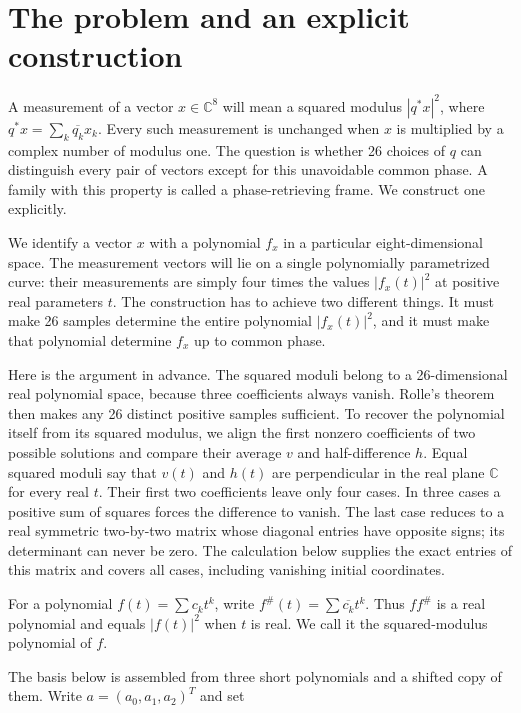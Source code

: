 \section{The problem and an explicit
construction}\label{the-problem-and-an-explicit-construction}

A measurement of a vector \(x\in\mathbb C^8\) will mean a squared
modulus \(|q^*x|^2\), where \(q^*x=\sum_k\overline{q_k}x_k\). Every such
measurement is unchanged when \(x\) is multiplied by a complex number of
modulus one. The question is whether 26 choices of \(q\) can distinguish
every pair of vectors except for this unavoidable common phase. A family
with this property is called a phase-retrieving frame. We construct one
explicitly.

We identify a vector \(x\) with a polynomial \(f_x\) in a particular
eight-dimensional space. The measurement vectors will lie on a single
polynomially parametrized curve: their measurements are simply four
times the values \(|f_x(t)|^2\) at positive real parameters \(t\). The
construction has to achieve two different things. It must make 26
samples determine the entire polynomial \(|f_x(t)|^2\), and it must make
that polynomial determine \(f_x\) up to common phase.

Here is the argument in advance. The squared moduli belong to a
26-dimensional real polynomial space, because three coefficients always
vanish. Rolle's theorem then makes any 26 distinct positive samples
sufficient. To recover the polynomial itself from its squared modulus,
we align the first nonzero coefficients of two possible solutions and
compare their average \(v\) and half-difference \(h\). Equal squared
moduli say that \(v(t)\) and \(h(t)\) are perpendicular in the real
plane \(\mathbb C\) for every real \(t\). Their first two coefficients
leave only four cases. In three cases a positive sum of squares forces
the difference to vanish. The last case reduces to a real symmetric
two-by-two matrix whose diagonal entries have opposite signs; its
determinant can never be zero. The calculation below supplies the exact
entries of this matrix and covers all cases, including vanishing initial
coordinates.

For a polynomial \(f(t)=\sum c_k t^k\), write
\(f^\#(t)=\sum\overline{c_k}t^k\). Thus \(ff^\#\) is a real polynomial
and equals \(|f(t)|^2\) when \(t\) is real. We call it the
squared-modulus polynomial of \(f\).

The basis below is assembled from three short polynomials and a shifted
copy of them. Write \(a=(a_0,a_1,a_2)^T\) and set

